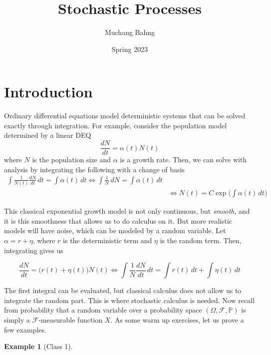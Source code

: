 \documentclass{article}
\theoremstyle{definition}
\newtheorem{example}{Example}[section]
\theoremstyle{remark}
\theoremstyle{definition}
\begin{document}
\pagestyle{fancy}

\cfoot{\thepage / \pageref{LastPage}}

\title{Stochastic Processes}
\author{Muchang Bahng}
\date{Spring 2023}

\maketitle
\tableofcontents 
\pagebreak 

\section{Introduction}

  Ordinary differential equations model deterministic systems that can be solved exactly through integration. For example, consider the population model determined by a linear DEQ 
  \[\frac{d N} {dt} = \alpha(t) N (t)\]
  where $N$ is the population size and $\alpha$ is a growth rate. Then, we can solve with analysis by integrating the following with a change of basis
  \begin{align*}
    \int \frac{1}{N(t)} \frac{dN}{dt} \,dt = \int \alpha(t) \,dt \iff \int \frac{1}{N} \, dN = \int \alpha(t) \,dt \\
    & \iff N(t) = C \exp \bigg( \int \alpha (t) \,dt \bigg) 
  \end{align*}
  
  This classical exponential growth model is not only continuous, but \textit{smooth}, and it is this smoothness that allows us to do calculus on it. But more realistic models will have noise, which can be modeled by a random variable. Let $\alpha = r + \eta$, where $r$ is the deterministic term and $\eta$ is the random term. Then, integrating gives us 

    \[\frac{dN}{dt} = \big( r(t) + \eta(t) \big) N(t) \iff \int \frac{1}{N} \frac{dN}{dt} \,dt = \int r(t) \,dt + \int \eta(t) \,dt\]
    
  The first integral can be evaluated, but classical calculus does not allow us to integrate the random part. This is where stochastic calculus is needed. Now recall from probability that a random variable over a probability space $(\Omega, \mathcal{F}, \mathbb{P})$ is simply a $\mathcal{F}$-measurable function $X$. As some warm up exercises, let us prove a few examples. 

  \begin{example}[Class 1] 
    
  \end{example}
\end{document}
